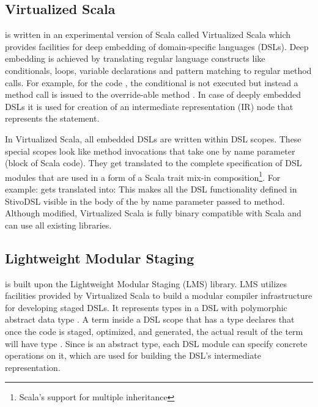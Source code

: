\subsection{Virtualized Scala}
\label{subsec:virtualized-scala}
\tool is written in an experimental version of Scala called Virtualized Scala
\cite{moors_scala-virtualized_2012} which provides facilities for deep embedding
of domain-specific languages (DSLs). Deep embedding is achieved by translating
regular language constructs like conditionals, loops, variable declarations and
pattern matching to regular method calls. For example, for the code , the conditional is not executed but instead a method call is issued
to the override-able method . In case of deeply
embedded DSLs it is used for creation of an intermediate representation (IR)
node that represents the  statement.

In Virtualized Scala, all embedded DSLs are written within DSL scopes. These special scopes look like method invocations that take one by name parameter (block of Scala code). They get translated to the complete specification of DSL modules that are used in a form of a Scala trait mix-in composition\footnote[1]{Scala's support for multiple inheritance}. For example: 
 gets translated into:
This makes all the DSL functionality defined in StivoDSL visible in the body of the by name parameter passed to \tool method. 
Although modified, Virtualized Scala is fully binary compatible with Scala and can use all existing libraries.  


\subsection{Lightweight Modular Staging}
\label{subsec:lightweight-modular-staging}

\tool is built upon the Lightweight Modular Staging (LMS) library. LMS utilizes facilities provided by Virtualized Scala to build a modular compiler infrastructure for developing staged DSLs. It represents types in a DSL with polymorphic abstract data type . A term inside a DSL scope that has a type  declares that once the code is staged, optimized, and generated, the actual result of the term will have type . Since  is an abstract type, each DSL module can specify concrete operations on it, which are used for building the DSL's intermediate representation. 

